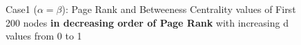 \documentclass{article}
\begin{document}
\begin{enumerate}
\begin{figure}[!hbtp]
\hfill
{}
\hfill
{}
\hfill
{}
\hfill
\caption{
\label{case1rankplotPR}%
Case1 ($\alpha=\beta$): Page Rank and Betweeness Centrality values of First 200 nodes \textbf{in decreasing order of Page Rank} with increasing d values from 0 to 1}
\end{figure}


\end{enumerate}
\end{document}
